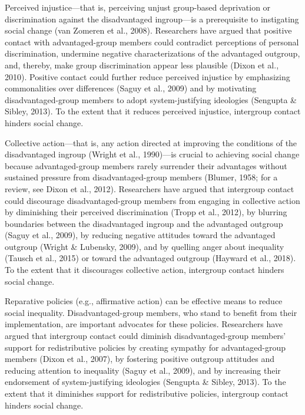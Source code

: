 \documentclass[12pt, letterpaper]{article}
\begin{document}
Perceived injustice---that is, perceiving unjust group-based deprivation
or discrimination against the disadvantaged ingroup---is a prerequisite
to instigating social change (van Zomeren et al., 2008). Researchers
have argued that positive contact with advantaged-group members could
contradict perceptions of personal discrimination, undermine negative
characterizations of the advantaged outgroup, and, thereby, make group
discrimination appear less plausible (Dixon et al., 2010). Positive
contact could further reduce perceived injustice by emphasizing
commonalities over differences (Saguy et al., 2009) and by motivating
disadvantaged-group members to adopt system-justifying ideologies
(Sengupta \& Sibley, 2013). To the extent that it reduces perceived
injustice, intergroup contact hinders social change.

Collective action---that is, any action directed at improving the
conditions of the disadvantaged ingroup (Wright et al., 1990)---is
crucial to achieving social change because advantaged-group members
rarely surrender their advantages without sustained pressure from
disadvantaged-group members (Blumer, 1958; for a review, see Dixon et
al., 2012). Researchers have argued that intergroup contact could
discourage disadvantaged-group members from engaging in collective
action by diminishing their perceived discrimination (Tropp et al.,
2012), by blurring boundaries between the disadvantaged ingroup and the
advantaged outgroup (Saguy et al., 2009), by reducing negative attitudes
toward the advantaged outgroup (Wright \& Lubensky, 2009), and by
quelling anger about inequality (Tausch et al., 2015) or toward the
advantaged outgroup (Hayward et al., 2018). To the extent that it
discourages collective action, intergroup contact hinders social change.

Reparative policies (e.g., affirmative action) can be effective means to
reduce social inequality. Disadvantaged-group members, who stand to
benefit from their implementation, are important advocates for these
policies. Researchers have argued that intergroup contact could diminish
disadvantaged-group members' support for redistributive policies by
creating sympathy for advantaged-group members (Dixon et al., 2007), by
fostering positive outgroup attitudes and reducing attention to
inequality (Saguy et al., 2009), and by increasing their endorsement of
system-justifying ideologies (Sengupta \& Sibley, 2013). To the extent
that it diminishes support for redistributive policies, intergroup
contact hinders social change.
\end{document}
